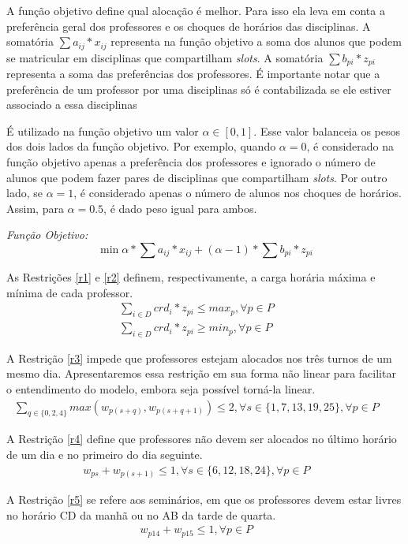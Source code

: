 A função objetivo define qual alocação é melhor. Para isso ela leva em conta a preferência geral dos professores e os choques de horários das disciplinas. A somatória $\sum a_{ij} * x_{ij}$ representa na função objetivo a soma dos alunos que podem se matricular em disciplinas que compartilham \textit{slots}. A somatória $\sum b_{pi} * z_{pi}$ representa a soma das preferências dos professores. É importante notar que a preferência de um professor por uma disciplinas só é contabilizada se ele estiver associado a essa disciplinas

É utilizado na função objetivo um valor $\alpha\in[0,1]$. Esse valor balanceia os pesos dos dois lados da função objetivo. Por exemplo, quando $\alpha = 0$, é considerado na função objetivo apenas a preferência dos professores e ignorado o número de alunos que podem fazer pares de disciplinas que compartilham \textit{slots}. Por outro lado, se $\alpha = 1$, é considerado apenas o número de alunos nos choques de horários. Assim, para $\alpha = 0.5$, é dado peso igual para ambos.

\emph{Função Objetivo:}
$$
\min{\alpha * \sum a_{ij} * x_{ij} + (\alpha-1) * \sum b_{pi} * z_{pi}}
$$

As Restrições \ref{r1} e \ref{r2} definem, respectivamente, a carga horária máxima e mínima de cada professor.
\begin{eqnarray}
\label{r1}
\sum_{i\in{D}}^{}{crd_i * z_{pi}} \le max_p, \forall{p}\in{P} &&\\
\label{r2}
\sum_{i\in{D}}^{}{crd_i * z_{pi}} \ge min_p, \forall{p}\in{P} &&
\end{eqnarray}

A Restrição \ref{r3} impede que professores estejam alocados nos três turnos de um mesmo dia. Apresentaremos essa restrição em sua forma não linear para facilitar o entendimento do modelo, embora seja possível torná-la linear.
\begin{eqnarray}
\label{r3}
\sum_{q\in\{{0,2,4}\}}^{}{max(w_{p(s+q)}, w_{p(s+q+1)})}  \leq 2, \forall{s}\in{\{1,7,13,19,25\}}, \forall{p}\in{P}  &&
\end{eqnarray}

A Restrição \ref{r4} define que professores não devem ser alocados no último horário de um dia e no primeiro do dia seguinte.
\begin{eqnarray}
\label{r4}
w_{ps} + w_{p(s+1)}  \leq 1, \forall{s}\in{\{6, 12, 18, 24\}}, \forall{p}\in{P}  &&
\end{eqnarray}

A Restrição \ref{r5} se refere aos seminários, em que os professores devem estar livres no horário CD da manhã ou no AB da tarde de quarta.
\begin{eqnarray}
\label{r5}
w_{p14} + w_{p15} \leq 1, \forall{p\in{P}} &&
\end{eqnarray}

